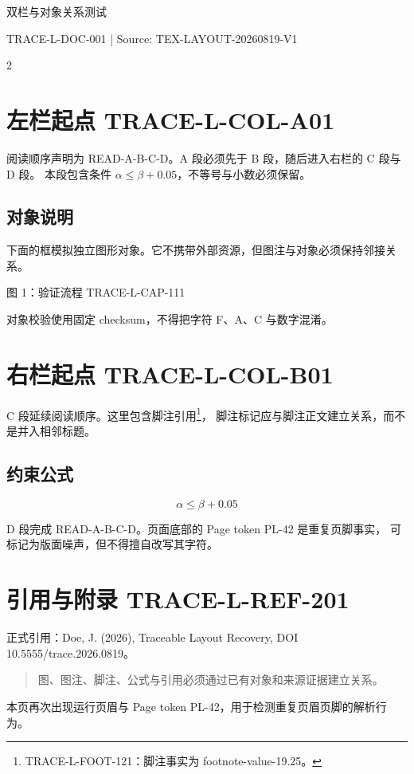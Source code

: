 \documentclass[10pt,a4paper]{ctexart}
\begin{document}
\begin{center}
{\LARGE 双栏与对象关系测试}\par
{\small TRACE-L-DOC-001 | Source: TEX-LAYOUT-20260819-V1}
\end{center}

\begin{multicols}{2}
\section{左栏起点 TRACE-L-COL-A01}
阅读顺序声明为 READ-A-B-C-D。A 段必须先于 B 段，随后进入右栏的 C 段与 D 段。
本段包含条件 $\alpha \leq \beta + 0.05$，不等号与小数必须保留。

\subsection{对象说明}
下面的框模拟独立图形对象。它不携带外部资源，但图注与对象必须保持邻接关系。

\begin{center}

\small 图 1：验证流程 TRACE-L-CAP-111
\end{center}

对象校验使用固定 checksum，不得把字符 F、A、C 与数字混淆。

\columnbreak
\section{右栏起点 TRACE-L-COL-B01}
C 段延续阅读顺序。这里包含脚注引用\footnote{TRACE-L-FOOT-121：脚注事实为 footnote-value-19.25。}，
脚注标记应与脚注正文建立关系，而不是并入相邻标题。

\subsection{约束公式}
\begin{equation}
\alpha \leq \beta + 0.05
\tag{TRACE-L-EQ-131}
\end{equation}

D 段完成 READ-A-B-C-D。页面底部的 Page token PL-42 是重复页脚事实，
可标记为版面噪声，但不得擅自改写其字符。
\end{multicols}

\newpage
\section{引用与附录 TRACE-L-REF-201}
正式引用：Doe, J. (2026), Traceable Layout Recovery, DOI 10.5555/trace.2026.0819。

\begin{quote}
图、图注、脚注、公式与引用必须通过已有对象和来源证据建立关系。
\end{quote}

本页再次出现运行页眉与 Page token PL-42，用于检测重复页眉页脚的解析行为。
\end{document}
